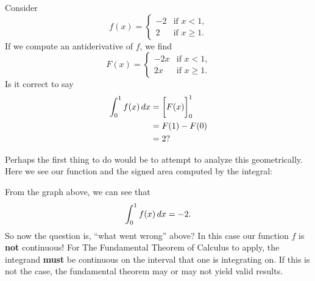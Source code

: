 \documentclass{ximera}
\begin{document}
\begin{question}
  Consider
  \[
  f(x) =
  \begin{cases}
    -2  &\text{if $x< 1$,}\\
    2 &\text{if $x\ge 1$.}
  \end{cases}
  \]
  If we compute an antiderivative of $f$, we find
  \[
  F(x) =
  \begin{cases}
    -2x  &\text{if $x< 1$,}\\
    2x &\text{if $x\ge 1$.}
  \end{cases}
  \]
  Is it correct to say
  \begin{align*}
    \int_0^1 f(x) \,d x &= \bigg[ F(x) \bigg]_0^1 \\
    &=F(1) - F(0)\\
    &=2 ?
  \end{align*}
  \begin{multipleChoice}
  \end{multipleChoice}
  \begin{feedback}
    Perhaps the first thing to do would be to attempt to analyze this
    geometrically. Here we see our function and the signed area
    computed by the integral:
    \begin{image}
    \end{image}
    From the graph above, we can see that
    \[
    \int_0^1 f(x) \,d x =-2.
    \]
    So now the question is, ``what went wrong'' above? In this case
    our function $f$ is \textbf{not} continuous! For The Fundamental
    Theorem of Calculus to apply, the integrand \textbf{must} be
    continuous on the interval that one is integrating on. If this is
    not the case, the fundamental theorem may or may not yield valid
    results.
  \end{feedback}
\end{question}
\end{document}
